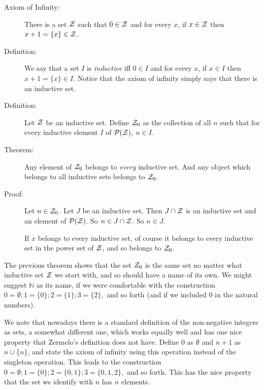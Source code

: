 \documentclass[12pt]{article}
\begin{document}
\begin{description}

\item[Axiom of Infinity:]  There is a set $\cal Z$ such that $0 \in {\cal Z}$ and for every $x$, if $x \in {\cal Z}$ then $x+1 = \{x\} \in {\cal Z}$.

\item[Definition:]  We say that a set $I$ is {\em inductive\/} iff $0 \in I$ and for every $x$, if $x \in I$ then $x+1 = \{x\} \in I$.  Notice that the axiom of infinity simply says that there is an inductive set.

\item[Definition:]  Let $\cal Z$ be an inductive set.  Define ${\cal Z}_0$  as the collection of all $n$ such that for every inductive element $I$ of ${\cal P}({\cal Z})$, $n \in I$.

\item[Theorem:]  Any element of ${\cal Z}_0$ belongs to {\em every\/} inductive set.  And any object which belongs to all inductive sets belongs to ${\cal Z}_0$. 

\item[Proof:]  Let $n \in {\cal Z}_0$.  Let $J$ be an inductive set.  Then $J \cap {\cal Z}$ is an inductive set and an element of ${\cal P}({\cal Z})$.  So $n \in J \cap {\cal Z}$.   So $n \in J$.

If $x$ belongs to every inductive set, of course it belongs to every inductive set in the power set of ${\cal Z}$, and so belongs to ${\cal Z}_0$.
 

\end{description}

The previous theorem shows that the set ${\cal Z}_0$ is the same set no matter what inductive set $\cal Z$ we start with, and so should have a name of its own.  We might suggest $\mathbb N$ as its name, if we were comfortable with the construction $0 =\emptyset; 1 = \{0\}; 2 = \{1\}; 3 = \{2\},$ and so forth (and if we included 0 in the natural numbers).

We note that nowadays there is a standard definition of the non-negative integers as sets, a somewhat different one, which works equally well and has one nice property that Zermelo's definition does not have.  Define 0 as $\emptyset$ and $n+1$ as
$n \cup \{n\}$, and state the axiom of infinity using this operation instead of the singleton operation.  This leads to
the construction $0 = \emptyset;  1 = \{0\}; 2 = \{0,1\}; 3 = \{0,1,2\},$ and so forth.  This has the nice property that the set we identify with $n$ has $n$ elements.
\end{document}
